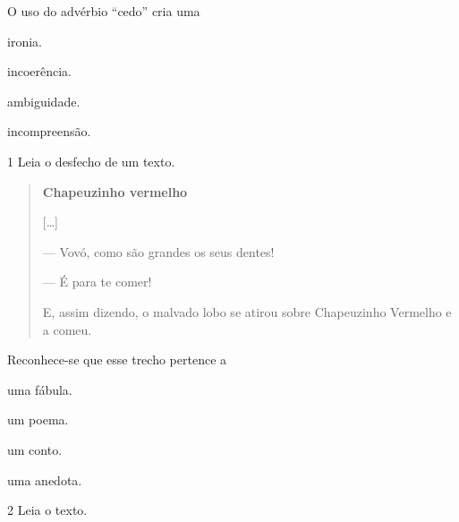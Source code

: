 O uso do advérbio ``cedo'' cria uma

\begin{escolha}
\item ironia.

\item incoerência.

\item ambiguidade.

\item incompreensão.
\end{escolha}

\vspace*{-3.4cm}

\num{1} Leia o desfecho de um texto.

\begin{quote}
\textbf{Chapeuzinho vermelho}

{[}\ldots{}{]}

--- Vovó, como são grandes os seus dentes!

--- É para te comer!

E, assim dizendo, o malvado lobo se atirou sobre Chapeuzinho Vermelho e a
comeu.

\end{quote}

Reconhece-se que esse trecho pertence a

\begin{escolha}
\item uma fábula.

\item um poema.

\item um conto.

\item uma anedota.
\end{escolha}



\num{2} Leia o texto.

